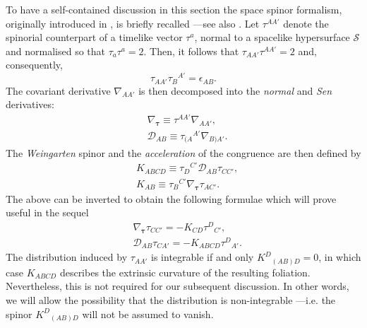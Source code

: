 \documentclass[10pt,a4paper]{article}
\theoremstyle{plain}
\begin{document}
To have a self-contained discussion in this section the space spinor
formalism, originally introduced in \cite{Som80}, is briefly recalled
---see also \cite{GarVal08c,BaeVal10b,CFEbook}.  Let $\tau^{AA'}$
denote the spinorial counterpart of a timelike vector $\tau^{a}$,
normal to a spacelike hypersurface $\mathcal{S}$ and normalised so
that $\tau_{a}\tau^{a}=2$.  Then, it follows that
$\tau_{AA'}\tau^{AA'}=2$ and, consequently,
\[\tau_{AA'}\tau_B{}^{A'}=\epsilon_{AB}.\]  
The covariant derivative $\nabla_{AA'}$ is then decomposed into the
\emph{normal} and \emph{Sen} derivatives:
\begin{align*}
  &\nabla_{\bm\tau} \equiv \tau^{AA'}\nabla_{AA'},\\ & \mathcal{D}_{AB}\equiv
  \tau_{(A}{}^{A'}\nabla_{B)A'}.
\end{align*}
The \emph{Weingarten} spinor and the \emph{acceleration} of the
congruence are then defined by
\begin{align*}
& K_{ABCD} \equiv \tau_{D}{}^{C'} \mathcal{D}_{AB}\tau_{CC'},\\ &
  K_{AB} \equiv \tau_{B}{}^{C'} \nabla_{\bm\tau}\tau_{AC'}.
\end{align*}
The above can be inverted to obtain the following formulae which will
prove useful in the sequel
\begin{align*}
  & \nabla_{\bm\tau} \tau_{CC'}=- K_{CD} \tau^{D}{}_{C'},\\ &
  \mathcal{D}_{AB}\tau_{CA'} = - K_{ABCD} \tau^{D}{}_{A'}.
\end{align*}
The distribution induced by $\tau_{AA'}$ is integrable if and only
$K^D{}_{(AB)D}=0$, in which case $K_{ABCD}$ describes the extrinsic
curvature of the resulting foliation.
 Nevertheless, this is not required for our subsequent discussion.
In other words, we will allow
 the possibility that the distribution is non-integrable
---i.e. the spinor $ K^D{}_{(AB)D}$ will not be assumed
to vanish. 

\medskip
\end{document}
